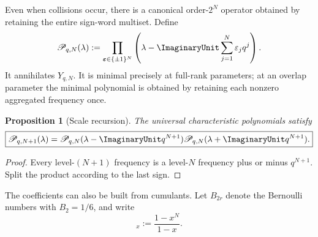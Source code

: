 \documentclass[11pt]{article}
\numberwithin{equation}{section}
\newtheorem{proposition}[theorem]{Proposition}
\theoremstyle{definition}
\theoremstyle{remark}
\newcommand{\eps}{\varepsilon}
\begin{document}
Even when collisions occur, there is a canonical order-$2^N$ operator obtained
by retaining the entire sign-word multiset.  Define
\begin{equation}
 \mathscr P_{q,N}(\lambda):=
 \prod_{\bm\eps\in\{\pm1\}^N}
 \left(\lambda-\ImaginaryUnit\sum_{j=1}^{N}\eps_jq^j\right).
 \label{eq:universal-characteristic}
\end{equation}
It annihilates $Y_{q,N}$.  It is minimal precisely at full-rank parameters; at
an overlap parameter the minimal polynomial is obtained by retaining each
nonzero aggregated frequency once.

\begin{proposition}[Scale recursion]
\label{prop:universal-recursion}
The universal characteristic polynomials satisfy
\begin{equation}
 \boxed{
 \mathscr P_{q,N+1}(\lambda)=
 \mathscr P_{q,N}(\lambda-\ImaginaryUnit q^{N+1})
 \mathscr P_{q,N}(\lambda+\ImaginaryUnit q^{N+1}).}
 \label{eq:universal-recursion}
\end{equation}
\end{proposition}
\begin{proof}
Every level-$(N+1)$ frequency is a level-$N$ frequency plus or minus
$q^{N+1}$.  Split the product according to the last sign.
\end{proof}

The coefficients can also be built from cumulants.  Let $B_{2r}$ denote the
Bernoulli numbers with $B_2=1/6$, and write
\begin{equation}
 [N]_x:=\frac{1-x^N}{1-x}.
 \label{eq:q-integer}
\end{equation}
\end{document}
